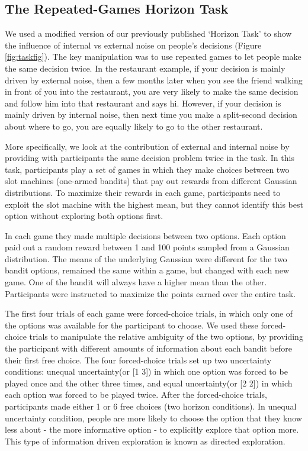 \documentclass[12pt]{article}
\begin{document}
	\subsection*{The Repeated-Games Horizon Task}
	We used a modified version of our previously published `Horizon Task' \citep{wilson2014} to show the influence of internal vs external noise on people's decisions (Figure \ref{fig:taskfig}). The key manipulation was to use repeated games to let people make the same decision twice. In the restaurant example, if your decision is mainly driven by external noise, then a few months later when you see the friend walking in front of you into the restaurant, you are very likely to make the same decision and follow him into that restaurant and says hi. However, if your decision is mainly driven by internal noise, then next time you make a split-second decision about where to go, you are equally likely to go to the other restaurant.
	
	More specifically, we look at the contribution of external and internal noise by providing with participants the same decision problem twice in the task. In this task, participants play a set of games in which they make choices between two slot machines (one-armed bandits) that pay out rewards from different Gaussian distributions. To maximize their rewards in each game, participants need to exploit the slot machine with the highest mean, but they cannot identify this best option without exploring both options first. 
	
	In each game they made multiple decisions between two options. Each option paid out a random reward between 1 and 100 points sampled from a Gaussian distribution. The means of the underlying Gaussian were different for the two bandit options, remained the same within a game, but changed with each new game. One of the bandit will always have a higher mean than the other. Participants were instructed to maximize the points earned over the entire task.
	
	The first four trials of each game were forced-choice trials, in which only one of the options was available for the participant to choose. We used these forced-choice trials to manipulate the relative ambiguity of the two options, by providing the participant with different amounts of information about each bandit before their first free choice. The four forced-choice trials set up two uncertainty conditions: unequal uncertainty(or [1 3]) in which one option was forced to be played once and the other three times, and equal uncertainty(or [2 2]) in which each option was forced to be played twice. After the forced-choice trials, participants made either 1 or 6 free choices (two horizon conditions). In unequal uncertainty condition, people are more likely to choose the option that they know less about - the more informative option - to explicitly explore that option more. This type of information driven exploration is known as directed exploration.
	
\end{document}
